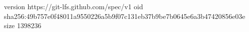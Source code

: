 version https://git-lfs.github.com/spec/v1
oid sha256:49b757e0f48011a9550226a5b9f07c131eb37b9be7b0645e6a3b47420856e03e
size 1398236
